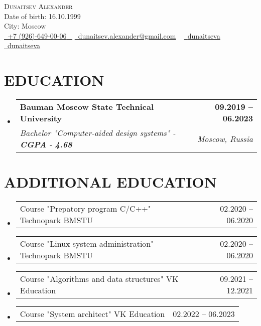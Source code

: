 \documentclass[letterpaper,11pt]{article}
\makeatletter
\newcommand{\resumeSubheading}[4]{
  \vspace{-2pt}\item
    \begin{tabular*}{1.0\textwidth}[t]{l@{\extracolsep{\fill}}r}
      \textbf{\large#1} & \textbf{\small #2} \\
      \textit{\large#3} & \textit{\small #4} \\
      
    \end{tabular*}\vspace{-7pt}
}
\newcommand{\resumeSubheadingAdditional}[2]{
	\vspace{-2pt}\item
	\begin{tabular*}{1.0\textwidth}[t]{l@{\extracolsep{\fill}}r}
		\large#1 & \small #2 \\
		
	\end{tabular*}\vspace{-7pt}
}
\newcommand{\resumeSubHeadingListStart}{\begin{itemize}[leftmargin=0.0in, label={}]}
\newcommand{\resumeSubHeadingListEnd}{\end{itemize}}
\makeatother
\begin{document}


\begin{center}
    {\Huge \scshape Dunaitsev Alexander} \\ \vspace{1pt}
    Date of birth: 16.10.1999 \\  City: Moscow \\ \vspace{1pt}
    \small \href{tel:+79266490006}{ \raisebox{-0.1\height}\faPhone\ \underline{+7 (926)-649-00-06} ~} \href{dunaitsev.alexander@gmail.com}{\raisebox{-0.2\height}\faEnvelope\  \underline{dunaitsev.alexander@gmail.com}} ~ 
    \href{https://github.com/dunaitseva}{\raisebox{-0.2\height}\faGithub\ \underline{dunaitseva}} ~
    \href{https://t.me/dunaitseva}{\raisebox{-0.2\height}\faTelegram\ \underline{dunaitseva}} ~
    \vspace{-8pt}
\end{center}


\section{EDUCATION}
  \resumeSubHeadingListStart
  \resumeSubheading
  {Bauman Moscow State Technical University}{09.2019 -- 06.2023}
  {Bachelor "Computer-aided design systems" - \textbf{CGPA} - \textbf{4.68}}{Moscow, Russia}
  \resumeSubHeadingListEnd

\section{ADDITIONAL EDUCATION}
\resumeSubHeadingListStart
\resumeSubheadingAdditional
{Course "Prepatory program C/C++" Technopark BMSTU}{02.2020 -- 06.2020}
\resumeSubHeadingListEnd

\resumeSubHeadingListStart
\resumeSubheadingAdditional
{Course "Linux system administration" Technopark BMSTU}{02.2020 -- 06.2020}
\resumeSubHeadingListEnd

\resumeSubHeadingListStart
\resumeSubheadingAdditional
{Course "Algorithms and data structures" VK Education}{09.2021 -- 12.2021}
\resumeSubHeadingListEnd

\resumeSubHeadingListStart
\resumeSubheadingAdditional
{Course "System architect" VK Education}{02.2022 -- 06.2023}
\resumeSubHeadingListEnd
\end{document}
